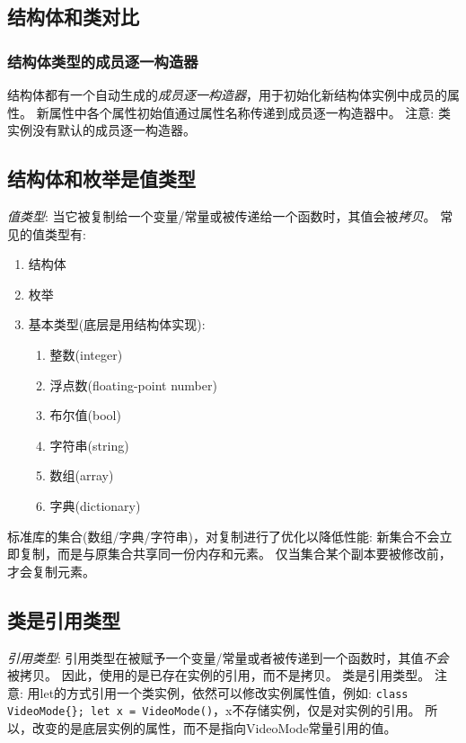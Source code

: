 \documentclass{../main.tex}{subfiles}
\begin{document}
\subsection{结构体和类对比}
\subsubsection{结构体类型的成员逐一构造器}
结构体都有一个自动生成的\emph{成员逐一构造器}，用于初始化新结构体实例中成员的属性。
新属性中各个属性初始值通过属性名称传递到成员逐一构造器中。
注意: 类实例没有默认的成员逐一构造器。

\subsection{结构体和枚举是值类型}
\emph{值类型}: 当它被复制给一个变量/常量或被传递给一个函数时，其值会被\emph{拷贝}。
常见的值类型有:
\begin{enumerate}[itemsep=0pt, parsep=0pt, topsep=0pt, partopsep=0pt]
    \item 结构体
    \item 枚举
    \item 基本类型(底层是用结构体实现):
        \begin{enumerate}[itemsep=0pt, parsep=0pt, topsep=0pt, partopsep=0pt]
            \item 整数(integer)
            \item 浮点数(floating-point number)
            \item 布尔值(bool)
            \item 字符串(string)
            \item 数组(array)
            \item 字典(dictionary)
        \end{enumerate}
\end{enumerate}
标准库的集合(数组/字典/字符串)，对复制进行了优化以降低性能: 
新集合不会立即复制，而是与原集合共享同一份内存和元素。
仅当集合某个副本要被修改前，才会复制元素。

\subsection{类是引用类型}
\emph{引用类型}: 引用类型在被赋予一个变量/常量或者被传递到一个函数时，其值\emph{不会}被拷贝。
因此，使用的是已存在实例的引用，而不是拷贝。
类是引用类型。
注意: 用let的方式引用一个类实例，依然可以修改实例属性值，例如: 
\lstinline|class VideoMode{}; let x = VideoMode()|，x不存储实例，仅是对实例的引用。
所以，改变的是底层实例的属性，而不是指向VideoMode常量引用的值。
\end{document}
